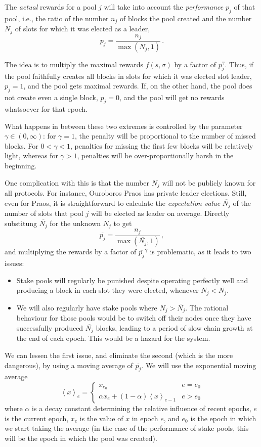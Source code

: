 \documentclass[11pt,a4paper]{article}
\newcommand*\ema[2]{\left\langle {#1} \right\rangle_{{#2}}}
\newcommand*\mean[1]{\overline{#1}}
\begin{document}
The \emph{actual} rewards for a pool \(j\) will take into account the
\emph{performance} \(p_j\) of that pool, i.e., the ratio of the number \(n_j\)
of blocks the pool created and the number \(N_j\) of slots for which it was
elected as a leader,
\[
p_j = \frac{n_j}{\max(N_j,1)}\,.
\]

The idea is to multiply the maximal rewards \(f(s,\sigma)\) by a factor of
\(p_j^\gamma\). Thus, if the pool faithfully creates all blocks in slots for
which it was elected slot leader, \(p_j=1\), and the pool gets maximal rewards.
If, on the other hand, the pool does not create even a single block,
\(p_j=0\), and the pool will get no rewards whatsoever for that epoch.

What happens in between these two extremes is controlled by the parameter
\(\gamma\in(0,\infty)\): for \(\gamma=1\), the penalty will be proportional to
the number of missed blocks. For \(0<\gamma<1\), penalties for missing the first
few blocks will be relatively light, whereas for \(\gamma>1\), penalties will be
over-proportionally harsh in the beginning.

One complication with this is that the number \(N_j\) will not be publicly known
for all protocols. For instance, Ouroboros Praos has private leader elections.
Still, even for Praos, it is straightforward to calculate the \emph{expectation
  value} \(\mean{N_j}\) of the number of slots that pool \(j\) will be elected
as leader on average. Directly substitung \(\mean{N_j}\) for the unknown \(N_j\)
to get
\[
\mean{p_j} = \frac{n_j}{\max(\mean{N_j},1)}\,,
\]
and multiplying the rewards by a factor of \(\mean{p_j}^\gamma\) is problematic,
as it leads to two issues:
\begin{itemize}
\item Stake pools will regularly be punished despite operating
  perfectly well and producing a block in each slot they were elected,
  whenever \(N_j < \mean{N_j}\).
\item We will also regularly have stake pools where
  \(N_j > \mean{N_j}\).
  The rational behaviour for those pools would be to switch off their
  nodes once they have successfully produced \(\mean{N_j}\)
  blocks, leading to a period of slow chain growth at the end of each
  epoch. This would be a hazard for the system.
\end{itemize}

We can lessen the first issue, and eliminate the second (which is the
more dangerous), by using a moving average of \(\mean{p_j}\).
We will use the exponential moving average
\[
  \ema{x}{e} =
  \begin{cases}
    x_{e_0} & e = e_0\\
    \alpha x_e + (1-\alpha) \ema{x}{e-1} & e > e_0
  \end{cases}
\]
where \(\alpha\) is a decay constant determining the relative influence of
recent epochs, \(e\) is the current epoch, \(x_e\) is the value of \(x\) in
epoch \(e\), and \(e_0\) is the epoch in which we start taking the average (in
the case of the performance of stake pools, this will be the epoch in which the
pool was created).
\end{document}
